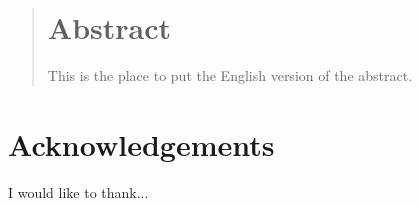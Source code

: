 {} %
\begin{abstract}
\section*{Abstract}
This is the place to put the English version of the abstract.
\end{abstract}

{}
\section*{Acknowledgements}
I would like to thank...